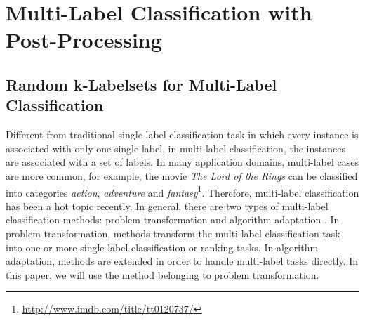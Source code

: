 \documentclass[letterpaper]{article}
\begin{document}
\begin{table}[ht]
\vspace{2ex}
\centering
\caption{An example of RAkEL on purpose and position classification with $k = 2$ and $m = 6$.}
\label{table:rakel_example}
\end{table}

\section{Multi-Label Classification with Post-Processing}
\label{sec:multi_label}
\subsection{Random k-Labelsets for Multi-Label Classification}
\label{subsec:labelsets}
Different from traditional single-label classification task in which every instance is associated with only one single label, in multi-label classification, the instances are associated with a set of labels. In many application domains, multi-label cases are more common, for example, the movie \textit{The Lord of the Rings} can be classified into categories \textit{action}, \textit{adventure} and \textit{fantasy}\footnote{\url{http://www.imdb.com/title/tt0120737/}}. Therefore, multi-label classification has been a hot topic recently. In general, there are two types of multi-label classification methods: problem transformation and algorithm adaptation \cite{tsoumakas2007multi,tsoumakas2010random}. In problem transformation, methods transform the multi-label classification task into one or more single-label classification or ranking tasks. In algorithm adaptation, methods are extended in order to handle multi-label tasks directly. In this paper, we will use the method belonging to problem transformation.
\end{document}
